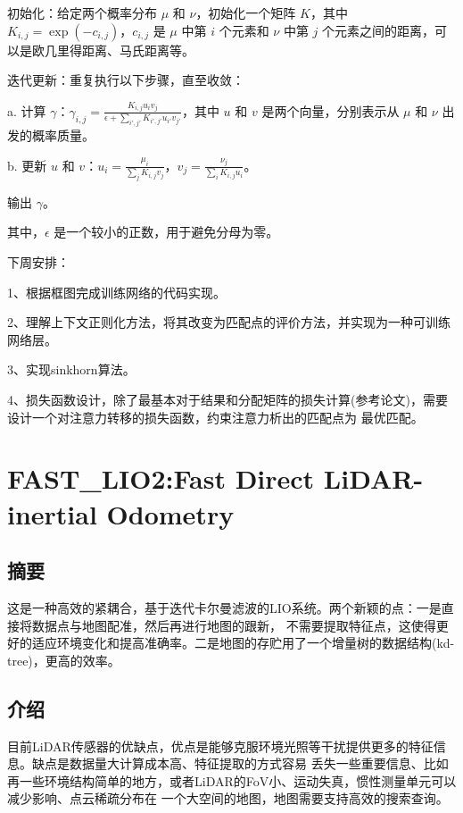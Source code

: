 \documentclass[10pt,a4paper]{article}
\begin{document}
初始化：给定两个概率分布 $\mu$ 和 $\nu$，初始化一个矩阵 $K$，其中 $K_{i,j} = \exp(-c_{i,j})$，$c_{i,j}$ 是 $\mu$ 中第
$i$ 个元素和 $\nu$ 中第 $j$ 个元素之间的距离，可以是欧几里得距离、马氏距离等。

迭代更新：重复执行以下步骤，直至收敛：

\qquad a. 计算 $\gamma$：$\gamma_{i,j}=\frac{K_{i,j}u_i v_j}{\epsilon+\sum_{i',j'}K_{i',j'}u_{i'}v_{j'}}$，其中 $u$ 和
 $v$ 是两个向量，分别表示从 $\mu$ 和 $\nu$ 出发的概率质量。

\qquad b. 更新 $u$ 和 $v$：$u_i=\frac{\mu_i}{\sum_j K_{i,j}v_j}$，$v_j=\frac{\nu_j}{\sum_i K_{i,j}u_i}$。

输出 $\gamma$。

其中，$\epsilon$ 是一个较小的正数，用于避免分母为零。

下周安排：

1、根据框图完成训练网络的代码实现。

2、理解上下文正则化方法，将其改变为匹配点的评价方法，并实现为一种可训练网络层。

3、实现sinkhorn算法。

4、损失函数设计，除了最基本对于结果和分配矩阵的损失计算(参考论文)，需要设计一个对注意力转移的损失函数，约束注意力析出的匹配点为
最优匹配。

\section{FAST\_LIO2:Fast Direct LiDAR-inertial Odometry}
\subsection{摘要}
这是一种高效的紧耦合，基于迭代卡尔曼滤波的LIO系统。两个新颖的点：一是直接将数据点与地图配准，然后再进行地图的跟新，
不需要提取特征点，这使得更好的适应环境变化和提高准确率。二是地图的存贮用了一个增量树的数据结构(kd-tree)，更高的效率。
\subsection{介绍}
目前LiDAR传感器的优缺点，优点是能够克服环境光照等干扰提供更多的特征信息。缺点是数据量大计算成本高、特征提取的方式容易
丢失一些重要信息、比如再一些环境结构简单的地方，或者LiDAR的FoV小、运动失真，惯性测量单元可以减少影响、点云稀疏分布在
一个大空间的地图，地图需要支持高效的搜索查询。
\end{document}

